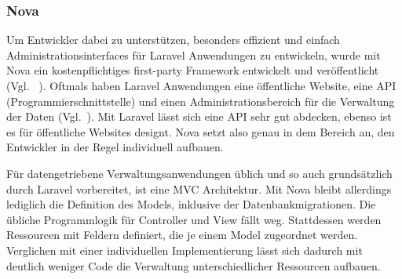 \subsubsection{Nova}
Um Entwickler dabei zu unterstützen, besonders effizient und einfach Administrationsinterfaces für Laravel Anwendungen zu entwickeln, wurde mit Nova ein kostenpflichtiges first-party Framework entwickelt und veröffentlicht (Vgl. ~\cite{laravel-nova}).
Oftmals haben Laravel Anwendungen eine öffentliche Website, eine API (Programmierschnittstelle) und einen Administrationsbereich für die Verwaltung der Daten (Vgl.~\cite{laravel-up-and-running}).
Mit Laravel lässt sich eine API sehr gut abdecken, ebenso ist es für öffentliche Websites designt.
Nova setzt also genau in dem Bereich an, den Entwickler in der Regel individuell aufbauen.

Für datengetriebene Verwaltungsanwendungen üblich und so auch grundsätzlich durch Laravel vorbereitet, ist eine MVC Architektur.
Mit Nova bleibt allerdings lediglich die Definition des Models, inklusive der Datenbankmigrationen.
Die übliche Programmlogik für Controller und View fällt weg.
Stattdessen werden Ressourcen mit Feldern definiert, die je einem Model zugeordnet werden.
Verglichen mit einer individuellen Implementierung lässt sich dadurch mit deutlich weniger Code die Verwaltung unterschiedlicher Ressourcen aufbauen.
